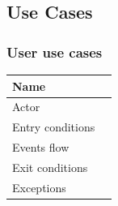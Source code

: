 \documentclass{article}
\begin{document}
\subsection{Use Cases}
\subsubsection{User use cases}
\begin{table}[H]
    \begin{tabular}{|l|l|}
    \hline
    Name & \begin{minipage}[t]{0.7\textwidth} \end{minipage} \\ \hline  
     Actor & \begin{minipage}[t]{0.7\textwidth} \end{minipage} \\ \hline 
     Entry conditions & \begin{minipage}[t]{0.7\textwidth} \end{minipage} \\
     \hline 
     Events flow & \begin{minipage}[t]{0.7\textwidth} \end{minipage} \\ \hline
     Exit conditions & \begin{minipage}[t]{0.7\textwidth} \end{minipage} \\
     \hline
     Exceptions & \begin{minipage}[t]{0.7\textwidth} \end{minipage} \\ \hline
    \end{tabular}
\end{table}
\end{document}
